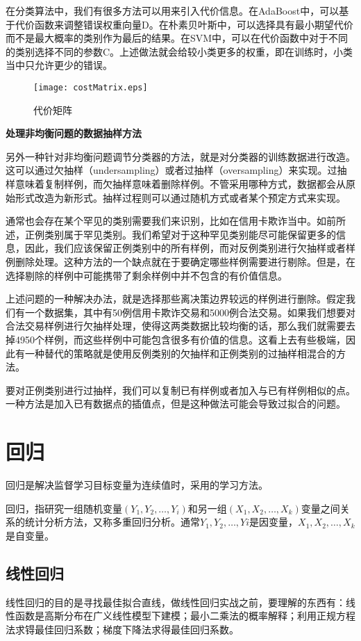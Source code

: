 在分类算法中，我们有很多方法可以用来引入代价信息。在AdaBoost中，可以基于代价函数来调整错误权重向量D。在朴素贝叶斯中，可以选择具有最小期望代价而不是最大概率的类别作为最后的结果。在SVM中，可以在代价函数中对于不同的类别选择不同的参数C。上述做法就会给较小类更多的权重，即在训练时，小类当中只允许更少的错误。
\begin{figure}[!h]
  \centering
  \texttt{[image: costMatrix.eps]}
  \caption{代价矩阵}
\end{figure}

\textbf{处理非均衡问题的数据抽样方法  }

另外一种针对非均衡问题调节分类器的方法，就是对分类器的训练数据进行改造。这可以通过欠抽样（undersampling）或者过抽样（oversampling）来实现。过抽样意味着复制样例，而欠抽样意味着删除样例。不管采用哪种方式，数据都会从原始形式改造为新形式。抽样过程则可以通过随机方式或者某个预定方式来实现。

通常也会存在某个罕见的类别需要我们来识别，比如在信用卡欺诈当中。如前所述，正例类别属于罕见类别。我们希望对于这种罕见类别能尽可能保留更多的信息，因此，我们应该保留正例类别中的所有样例，而对反例类别进行欠抽样或者样例删除处理。这种方法的一个缺点就在于要确定哪些样例需要进行剔除。但是，在选择剔除的样例中可能携带了剩余样例中并不包含的有价值信息。

上述问题的一种解决办法，就是选择那些离决策边界较远的样例进行删除。假定我们有一个数据集，其中有50例信用卡欺诈交易和5000例合法交易。如果我们想要对合法交易样例进行欠抽样处理，使得这两类数据比较均衡的话，那么我们就需要去掉4950个样例，而这些样例中可能包含很多有价值的信息。这看上去有些极端，因此有一种替代的策略就是使用反例类别的欠抽样和正例类别的过抽样相混合的方法。

要对正例类别进行过抽样，我们可以复制已有样例或者加入与已有样例相似的点。一种方法是加入已有数据点的插值点，但是这种做法可能会导致过拟合的问题。


\newpage
\section{回归}
回归是解决监督学习目标变量为连续值时，采用的学习方法。

回归，指研究一组随机变量$(Y_1,Y_2,\ldots,Y_i)$和另一组$(X_1,X_2,\ldots,X_k)$变量之间关系的统计分析方法，又称多重回归分析。通常$Y_1,Y_2,\ldots,Yi$是因变量，$X_1,X_2,\ldots,X_k$是自变量。

\subsection{线性回归}
线性回归的目的是寻找最佳拟合直线，做线性回归实战之前，要理解的东西有：线性函数是高斯分布在广义线性模型下建模；最小二乘法的概率解释；利用正规方程法求锝最佳回归系数；梯度下降法求得最佳回归系数。


